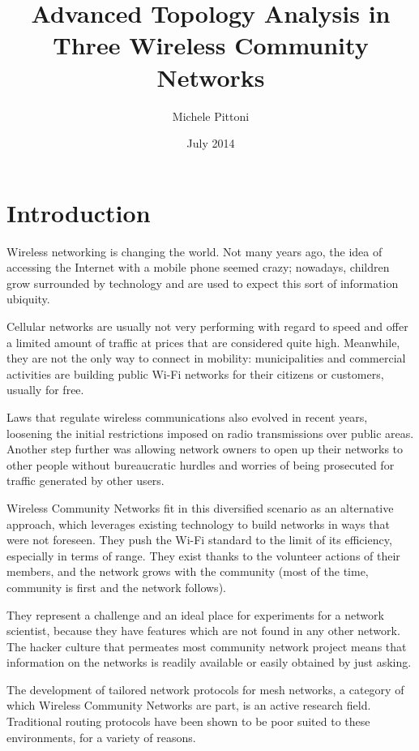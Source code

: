 \documentclass[a4paper,11pt,twoside,openright]{memoir}
\title{Advanced Topology Analysis in Three Wireless Community Networks}
\author{Michele Pittoni}
\date{July 2014}
\begin{document}

\cleardoublepage

\tableofcontents

\chapter*{Introduction}\label{introduction}

Wireless networking is changing the world. Not many years ago, the idea of
accessing the Internet with a mobile phone seemed crazy; nowadays, children
grow surrounded by technology and are used to expect this sort of information
ubiquity.

Cellular networks are usually not very performing with regard to speed and offer
a limited amount of traffic at prices that are considered quite high.
Meanwhile, they are not the only way to connect in mobility: municipalities
and commercial activities are building public Wi-Fi networks for their
citizens or customers, usually for free.

Laws that regulate wireless communications also evolved in recent years,
loosening the initial restrictions imposed on radio transmissions over
public areas.
Another step further was allowing network owners to open up their
networks to other people without bureaucratic hurdles and worries of being
prosecuted for traffic generated by other users.

Wireless Community Networks fit in this diversified scenario as an alternative
approach, which leverages existing technology to build networks in ways that 
were not foreseen.
They push the Wi-Fi standard to the limit of its efficiency, especially
in terms of range. They exist thanks to the volunteer actions of their members,
and the network grows with the community (most of the time, community is
first and the network follows).

They represent a challenge and an ideal place for experiments for a network
scientist, because they have features which are not found in any other network.
The hacker culture that permeates most community network project means that
information on the networks is readily available or easily obtained by just
asking.

The development of tailored network protocols for mesh networks, a category
of which Wireless Community Networks are part, is an active research field.
Traditional routing protocols have been shown to be poor suited to these
environments, for a variety of reasons.
\end{document}
